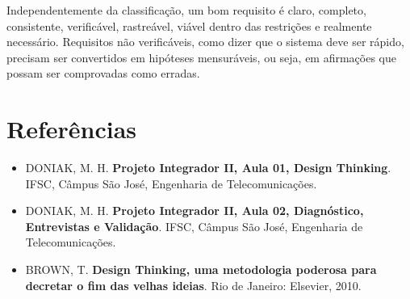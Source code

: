 \documentclass[11pt]{ifscarticle}
\begin{document}
Independentemente da classificação, um bom requisito é claro, completo,
consistente, verificável, rastreável, viável dentro das restrições e
realmente necessário. Requisitos não verificáveis, como dizer que o sistema
deve ser rápido, precisam ser convertidos em hipóteses mensuráveis, ou seja,
em afirmações que possam ser comprovadas como erradas.

\section*{Referências}

\begin{itemize}[label={}]
  \item DONIAK, M. H. \textbf{Projeto Integrador II, Aula 01, Design
  Thinking}. IFSC, Câmpus São José, Engenharia de Telecomunicações.
  \item DONIAK, M. H. \textbf{Projeto Integrador II, Aula 02, Diagnóstico,
  Entrevistas e Validação}. IFSC, Câmpus São José, Engenharia de
  Telecomunicações.
  \item BROWN, T. \textbf{Design Thinking, uma metodologia poderosa para
  decretar o fim das velhas ideias}. Rio de Janeiro: Elsevier, 2010.
\end{itemize}
\end{document}
